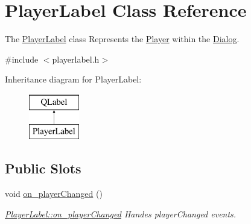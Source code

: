 \hypertarget{class_player_label}{\section{Player\-Label Class Reference}
\label{class_player_label}
}


The \hyperlink{class_player_label}{Player\-Label} class Represents the \hyperlink{class_player}{Player} within the \hyperlink{class_dialog}{Dialog}.  




{\ttfamily \#include $<$playerlabel.\-h$>$}

Inheritance diagram for Player\-Label\-:\begin{figure}[H]
\begin{center}
\leavevmode
\includegraphics[height=2.000000cm]{class_player_label}
\end{center}
\end{figure}
\subsection*{Public Slots}
\begin{DoxyCompactItemize}
\item 
void \hyperlink{class_player_label_a4e79270b2cc5ae00ff3ea5e648d48e0a}{on\-\_\-player\-Changed} ()
\begin{DoxyCompactList}\small\item\em \hyperlink{class_player_label_a4e79270b2cc5ae00ff3ea5e648d48e0a}{Player\-Label\-::on\-\_\-player\-Changed} Handes player\-Changed events. \end{DoxyCompactList}\end{DoxyCompactItemize}
